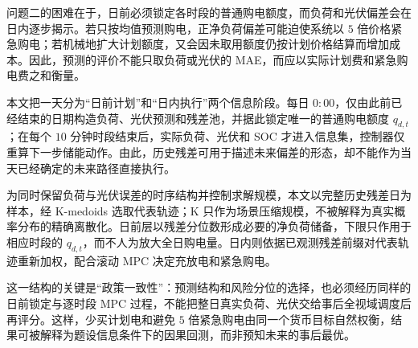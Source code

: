问题二的困难在于，日前必须锁定各时段的普通购电额度，而负荷和光伏偏差会在日内逐步揭示。若只按均值预测购电，正净负荷偏差可能迫使系统以 $5$ 倍价格紧急购电；若机械地扩大计划额度，又会因未取用额度仍按计划价格结算而增加成本。因此，预测的评价不能只取负荷或光伏的 MAE，而应以实际计划费和紧急购电费之和衡量。

本文把一天分为“日前计划”和“日内执行”两个信息阶段。每日 $0{:}00$，仅由此前已经结束的日期构造负荷、光伏预测和残差池，并据此锁定唯一的普通购电额度 $q_{d,t}$；在每个 $10$ 分钟时段结束后，实际负荷、光伏和 SOC 才进入信息集，控制器仅重算下一步储能动作。由此，历史残差可用于描述未来偏差的形态，却不能作为当天已经确定的未来路径直接执行。

为同时保留负荷与光伏误差的时序结构并控制求解规模，本文以完整历史残差日为样本，经 K-medoids 选取代表轨迹；K 只作为场景压缩规模，不被解释为真实概率分布的精确离散化。日前层以残差分位数形成必要的净负荷储备，下限只作用于相应时段的 $q_{d,t}$，而不人为放大全日购电量。日内则依据已观测残差前缀对代表轨迹重新加权，配合滚动 MPC 决定充放电和紧急购电。

这一结构的关键是“政策一致性”：预测结构和风险分位的选择，也必须经历同样的日前锁定与逐时段 MPC 过程，不能把整日真实负荷、光伏交给事后全视域调度后再评分。这样，少买计划电和避免 $5$ 倍紧急购电由同一个货币目标自然权衡，结果可被解释为题设信息条件下的因果回测，而非预知未来的事后最优。
